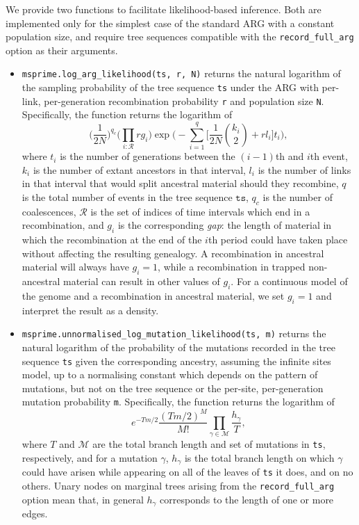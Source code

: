 \documentclass{article}
\begin{document}
We provide two functions to facilitate likelihood-based inference.
Both are implemented only for the simplest case of the standard ARG with a 
constant population size, and require tree sequences compatible with the 
\texttt{record\_full\_arg} option as their arguments.
\begin{itemize}
\item \texttt{msprime.log\_arg\_likelihood(ts, r, N)} returns the natural logarithm of 
the sampling probability of the tree sequence \texttt{ts} under the ARG with per-link,
per-generation recombination probability \texttt{r} and population size \texttt{N}.
Specifically, the function returns the logarithm of
\begin{equation*}
\Bigg( \frac{ 1 }{ 2 N } \Bigg)^{ q_c } \Bigg( \prod_{ i : \mathcal{R} } r g_i \Bigg)
	\exp\Bigg( -\sum_{ i = 1 }^q \Big[\frac{ 1 }{ 2 N } \binom{ k_i }{ 2 } 
		+ r l_i \Big] t_i  \Bigg),
\end{equation*}
where $t_i$ is the number of generations between the $(i - 1)$th and $i$th event,
$k_i$ is the number of extant ancestors in that interval, $l_i$ is the number of links
in that interval that would split ancestral material should they recombine,
$q$ is the total number of events in the tree sequence $\texttt{ts}$,
$q_c$ is the number of coalescences, $\mathcal{R}$ is the set of indices 
of time intervals which end in a recombination, and $g_i$ is the corresponding
\emph{gap}:  the length of material in which the recombination at the end of the 
$i$th period could have taken place without affecting the resulting genealogy.
A recombination in ancestral material will always have $g_i = 1$, while a recombination
in trapped non-ancestral material can result in other values of $g_i$.
For a continuous model of the genome and a recombination in ancestral material,
we set $g_i = 1$ and interpret the result as a density.
\item \texttt{msprime.unnormalised\_log\_mutation\_likelihood(ts, m)} returns the
natural logarithm of the probability of the mutations recorded in the tree sequence
\texttt{ts} given the corresponding ancestry, assuming the infinite sites model, up to
a normalising constant which depends on the pattern of mutations,
but not on the tree sequence or the per-site, per-generation mutation 
probability \texttt{m}.
Specifically, the function returns the logarithm of
\begin{equation*}
e^{ - T m / 2 } \frac{ ( T m / 2 )^M }{ M ! }
\prod_{ \gamma \in \mathcal{ M } } \frac{ h_{ \gamma } }{ T },
\end{equation*}
where $T$ and $\mathcal{M}$ are the total branch length and set of mutations
in \texttt{ts}, respectively, and for a mutation $\gamma$, $h_{ \gamma }$ is the
total branch length on which $\gamma$ could have arisen while appearing on all
of the leaves of \texttt{ts} it does, and on no others.
Unary nodes on marginal trees arising from the \texttt{record\_full\_arg} option
mean that, in general $h_{ \gamma }$ corresponds to the length of one or more
edges.
\end{itemize}
\end{document}
